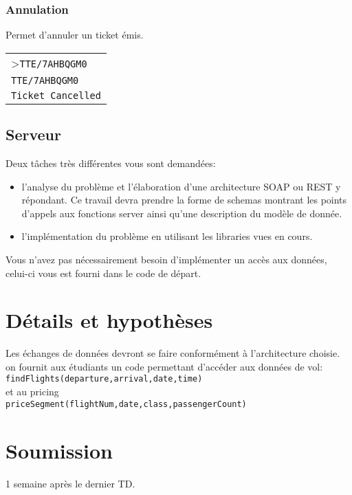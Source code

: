 \documentclass[a4paper,11pt]{article}
\begin{document}
\subsubsection*{Annulation}
Permet d'annuler un ticket émis.

\begin{centering}
\begin{tabular}{|p{\linewidth}|}
 \hline
>\texttt{TTE/7AHBQGM0} \\	
\texttt{TTE/7AHBQGM0} \\	
\texttt{Ticket Cancelled}\\

   \end{tabular}
\end{centering} 


\subsection*{Serveur}

Deux tâches très différentes vous sont demandées:
\begin{itemize}
	\item l'analyse du problème et l'élaboration d'une architecture SOAP ou REST y répondant. Ce travail devra prendre la forme de schemas montrant les points d'appels aux fonctions server ainsi qu'une description du modèle de donnée.
	\item l'implémentation du problème en utilisant les libraries vues en cours.
\end{itemize}
Vous n'avez pas nécessairement besoin d'implémenter un accès aux données, celui-ci vous est fourni dans le code de départ.

\section*{Détails et hypothèses}
Les échanges de données devront se faire conformément à l'architecture choisie.
on fournit aux étudiants un code permettant d'accéder aux données de vol:\\
\texttt{findFlights(departure,arrival,date,time)}\\
et au pricing \\
\texttt{priceSegment(flightNum,date,class,passengerCount)}


\section*{Soumission}
1 semaine après le dernier TD.
\end{document}
